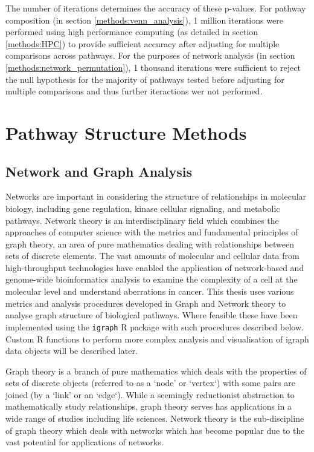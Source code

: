 The number of iterations determines the accuracy of these p-values. For pathway composition (in section \ref{methods:venn_analysis}), 1 million iterations were performed using high performance computing (as detailed in section \ref{methods:HPC}) to provide sufficient accuracy after adjusting for multiple comparisons across pathways. For the purposes of network analysis (in section \ref{methods:network_permutation}), 1 thousand iterations were sufficient to reject the null hypothesis for the majority of pathways tested before adjusting for multiple comparisons and thus further iteractions wer not performed.

\section{Pathway Structure Methods}

\subsection{Network and Graph Analysis}

Networks are important in considering the structure of relationships in molecular biology, including gene regulation, kinase cellular signaling, and metabolic pathways. Network theory is an interdisciplinary field which combines the approaches of computer science with the metrics and fundamental principles of graph theory, an area of pure mathematics dealing with relationships between sets of discrete elements. The vast amounts of molecular and cellular data from high-throughput technologies have enabled the application of network-based and genome-wide bioinformatics analysis to examine the complexity of a cell at the molecular level and understand aberrations in cancer. This thesis uses various metrics and analysis procedures developed in Graph and Network theory to analyse graph structure of biological pathways. Where feasible these have been implemented using the \texttt{igraph} R package with such procedures described below. Custom R functions to perform more complex analysis and visualisation of igraph data objects will be described later.

Graph theory is a branch of pure mathematics which deals with the properties of sets of discrete objects (referred to as a `node' or `vertex`) with some pairs are joined (by a `link' or an `edge`). While a seemingly reductionist abstraction to mathematically study relationships, graph theory serves has applications in a wide range of studies including life sciences. Network theory is the sub-discipline of graph theory which deals with networks which has become popular due to the vast potential for applications of networks. 

